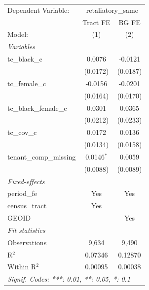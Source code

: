 \begingroup
\centering
\begin{tabular}{lcc}
   \tabularnewline \midrule \midrule
   Dependent Variable: & \multicolumn{2}{c}{retaliatory\_same}\\
                           & Tract FE     & BG FE \\   
   Model:                  & (1)          & (2)\\  
   \midrule
   \emph{Variables}\\
   tc\_black\_c            & 0.0076       & -0.0121\\   
                           & (0.0172)     & (0.0187)\\   
   tc\_female\_c           & -0.0156      & -0.0201\\   
                           & (0.0164)     & (0.0170)\\   
   tc\_black\_female\_c    & 0.0301       & 0.0365\\   
                           & (0.0212)     & (0.0233)\\   
   tc\_cov\_c              & 0.0172       & 0.0136\\   
                           & (0.0134)     & (0.0158)\\   
   tenant\_comp\_missing   & 0.0146$^{*}$ & 0.0059\\   
                           & (0.0088)     & (0.0089)\\   
   \midrule
   \emph{Fixed-effects}\\
   period\_fe              & Yes          & Yes\\  
   census\_tract           & Yes          & \\  
   GEOID                   &              & Yes\\  
   \midrule
   \emph{Fit statistics}\\
   Observations            & 9,634        & 9,490\\  
   R$^2$                   & 0.07346      & 0.12870\\  
   Within R$^2$            & 0.00095      & 0.00038\\  
   \midrule \midrule
   \multicolumn{3}{l}{\emph{Signif. Codes: ***: 0.01, **: 0.05, *: 0.1}}\\
\end{tabular}
\par\endgroup
\begingroup
\centering
